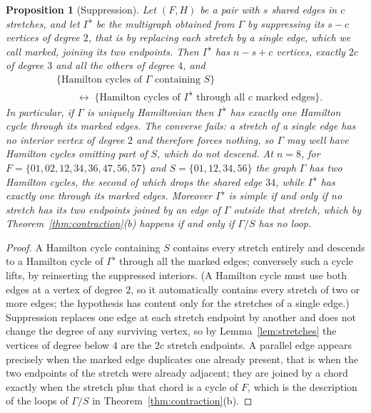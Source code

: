 \documentclass[11pt,a4paper]{article}
\newtheorem{proposition}[theorem]{Proposition}
\theoremstyle{definition}
\theoremstyle{remark}
\begin{document}
\begin{proposition}[Suppression]\label{prop:suppress}
Let $(F,H)$ be a pair with $s$ shared edges in $c$ stretches, and let $\Gamma^{\flat}$ be the multigraph obtained from $\Gamma$ by suppressing its $s-c$ vertices of degree $2$, that is by replacing each stretch by a single edge, which we call \emph{marked}, joining its two endpoints. Then $\Gamma^{\flat}$ has $n-s+c$ vertices, exactly $2c$ of degree $3$ and all the others of degree $4$, and
\[
\begin{aligned}
&\{\text{Hamilton cycles of }\Gamma\text{ containing }S\}\\
&\qquad\longleftrightarrow\;\{\text{Hamilton cycles of }\Gamma^{\flat}\text{ through all }c\text{ marked edges}\}.
\end{aligned}
\]
In particular, if $\Gamma$ is uniquely Hamiltonian then $\Gamma^{\flat}$ has exactly one Hamilton cycle through its marked edges. The converse fails: a stretch of a single edge has no interior vertex of degree $2$ and therefore forces nothing, so $\Gamma$ may well have Hamilton cycles omitting part of $S$, which do not descend. At $n=8$, for $F=\{01,02,12,34,36,47,56,57\}$ and $S=\{01,12,34,56\}$ the graph $\Gamma$ has two Hamilton cycles, the second of which drops the shared edge $34$, while $\Gamma^{\flat}$ has exactly one through its marked edges. Moreover $\Gamma^{\flat}$ is simple if and only if no stretch has its two endpoints joined by an edge of $\Gamma$ outside that stretch, which by Theorem~\ref{thm:contraction}(b) happens if and only if $\Gamma/S$ has no loop.
\end{proposition}

\begin{proof}
A Hamilton cycle containing $S$ contains every stretch entirely and descends to a Hamilton cycle of $\Gamma^{\flat}$ through all the marked edges; conversely such a cycle lifts, by reinserting the suppressed interiors. (A Hamilton cycle must use both edges at a vertex of degree $2$, so it automatically contains every stretch of two or more edges; the hypothesis has content only for the stretches of a single edge.) Suppression replaces one edge at each stretch endpoint by another and does not change the degree of any surviving vertex, so by Lemma~\ref{lem:stretches} the vertices of degree below $4$ are the $2c$ stretch endpoints. A parallel edge appears precisely when the marked edge duplicates one already present, that is when the two endpoints of the stretch were already adjacent; they are joined by a chord exactly when the stretch plus that chord is a cycle of $F$, which is the description of the loops of $\Gamma/S$ in Theorem~\ref{thm:contraction}(b).
\end{proof}
\end{document}

